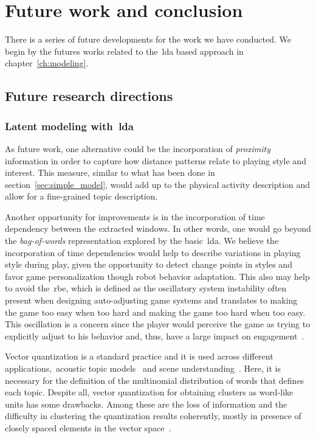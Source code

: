 \chapter{Future work and conclusion}\label{ch:future}

There is a series of future developments for the work we have conducted. We begin by the futures works related to the~\gls{lda} based approach in chapter~\ref{ch:modeling}.

\section{Future research directions}
\subsection{Latent modeling with~\gls{lda}}\label{sec:future_lda}
As future work, one alternative could be the incorporation of \textit{proximity} information in order to capture how distance patterns relate to playing style and interest. This measure, similar to what has been done in section~\ref{sec:simple_model}, would add up to the physical activity description and allow for a fine-grained topic description.

Another opportunity for improvements is in the incorporation of time dependency between the extracted windows. In other words, one would go beyond the \textit{bag-of-words} representation explored by the basic~\gls{lda}. We believe the incorporation of time dependencies would help to describe variations in playing style during play, given the opportunity to detect change points in styles and favor game personalization though robot behavior adaptation. This also may help to avoid the~\gls{rbe}, which is defined as the oscillatory system instability often present when designing auto-adjusting game systems and translates to making the game too easy when too hard and making the game too hard when too easy. This oscillation is a concern since the player would perceive the game as trying to explicitly adjust to his behavior and, thus, have a large impact on engagement~\citep{martinoia_physically_2013}.

Vector quantization is a standard practice and it is used across different applications,~\eg acoustic topic models~\citep{kim_acoustic_2009,kim_audio_2009} and scene understanding~\citep{cao_spatially_2007,li_towards_2009,niu_context_2012}. Here, it is necessary for the definition of the multinomial distribution of words that defines each topic. Despite all, vector quantization for obtaining clusters as word-like units has some drawbacks. Among these are the loss of information and the difficulty in clustering the quantization results coherently, mostly in presence of closely spaced elements in the vector space~\citep{hu_latent_2012}.

